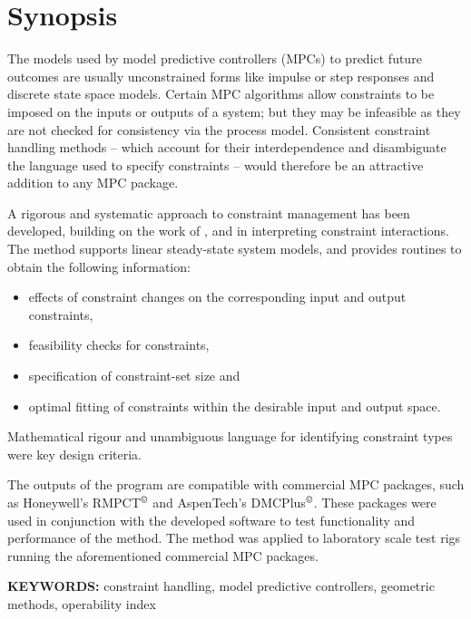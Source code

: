 \chapter*{Synopsis}
The models used by model predictive controllers (MPCs) to predict future outcomes are usually unconstrained forms like impulse or step responses and discrete state space models. 
Certain MPC algorithms allow constraints  to be imposed on the inputs or outputs of a system; but they may be infeasible as they are not checked for consistency via the process model. 
Consistent constraint handling methods -- which account for their interdependence and disambiguate the language used to specify constraints -- would therefore be an attractive addition to any MPC package.

A rigorous and systematic approach to constraint management has been developed, building on the work of \citet{vinsonphd}, \citet{limaphd} and \citet{opconproc} in interpreting constraint interactions. 
The method supports linear steady-state system models, and provides routines to obtain the following information:
\begin{itemize}
  \item effects of constraint changes on the corresponding input and output constraints,
  \item feasibility checks for constraints,
  \item specification of constraint-set size and
  \item optimal fitting of constraints within the desirable input and output space.
\end{itemize}
Mathematical rigour and unambiguous language for identifying constraint types were key design criteria. 

The outputs of the program are compatible with commercial MPC packages, such as Honeywell's RMPCT$^{\copyright}$ and AspenTech's DMCPlus$^{\copyright}$.
These packages were used in conjunction with the developed software to test functionality and performance of the method.
The method was applied to laboratory scale test rigs running the aforementioned commercial MPC packages.
\bigskip

\noindent \textbf{KEYWORDS:} constraint handling, model predictive
controllers, geometric methods, operability index

